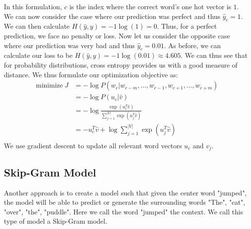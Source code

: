 \documentclass{tufte-handout}
\begin{document}
In this formulation, $c$ is the index where the correct word's one hot vector is $1$. We can now consider the case where our prediction was perfect and thus $\hat{y}_c = 1$. We can then calculate $H(\hat{y},y) = -1\log(1) = 0$. Thus, for a perfect prediction, we face no penalty or loss. Now let us consider the opposite case where our prediction was very bad and thus $\hat{y}_c = 0.01$. As before, we can calculate our loss to be $H(\hat{y},y) = -1\log(0.01) \approx 4.605$. We can thus see that for probability distributions, cross entropy provides us with a good measure of distance. We thus formulate our optimization objective as:
\begin{align*}
\operatorname{minimize} J &= -\log P(w_{c}|w_{c-m}, \hdots, w_{c-1}, w_{c+1}, \hdots, w_{c+m})\\
&= -\log P(u_{c}|\hat{v})\\
&= -\log \frac{\exp(u_{c}^{T}\hat{v})}{\sum_{j=1}^{|V|}\exp(u_{j}^{T}\hat{v})}\\
&= -u_{c}^{T}\hat{v}+\log \sum_{j=1}^{|V|}\exp(u_{j}^{T}\hat{v})\\
\end{align*}
We use gradient descent to update all relevant word vectors $u_{c}$ and $v_{j}$.\\


\subsection{Skip-Gram Model}



Another approach is to create a model such that given the center word "jumped", the model will be able to predict or generate the surrounding words "The", "cat", "over", "the", "puddle". Here we call the word "jumped" the context. We call this type of model a Skip-Gram model.

\end{document}
